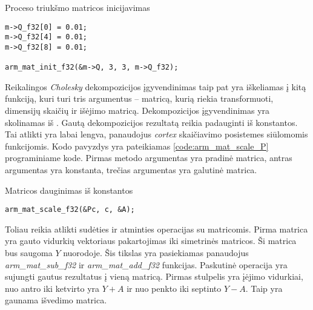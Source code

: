\begin{cfigure}
    \centering
    \caption{Proceso triukšmo matricos inicijavimas}
    \label{code:arm_q_matrix_init}
    \begin{lstlisting}
m->Q_f32[0] = 0.01;
m->Q_f32[4] = 0.01;
m->Q_f32[8] = 0.01;

arm_mat_init_f32(&m->Q, 3, 3, m->Q_f32);
    \end{lstlisting}
\end{cfigure}

Reikalingos \textit{Cholesky} dekompozicijos įgyvendinimas taip pat yra iškeliamas į kitą funkciją, kuri turi tris argumentus -- matricą, kurią riekia transformuoti, dimensijų skaičių ir išėjimo matricą.
Dekompozicijos įgyvendinimas yra skolinamas iš \cite{Cholesky6:online}.
Gautą dekompozicijos rezultatą reikia padauginti iš konstantos.
Tai atlikti yra labai lengva, panaudojus \textit{cortex} skaičiavimo posistemes siūlomomis funkcijomis.
Kodo pavyzdys yra pateikiamas \ref{code:arm_mat_scale_P} programiniame kode.
Pirmas metodo argumentas yra pradinė matrica, antras argumentas yra konstanta, trečias argumentas yra galutinė matrica.

\begin{cfigure}
    \centering
    \caption{Matricos dauginimas iš konstantos}
    \label{code:arm_mat_scale_P}
    \begin{lstlisting}
arm_mat_scale_f32(&Pc, c, &A);
    \end{lstlisting}
\end{cfigure}

Toliau reikia atlikti sudėties ir atminties operacijas su matricomis.
Pirma matrica yra gauto vidurkių vektoriaus pakartojimas iki simetrinės matricos.
Ši matrica bus saugoma $Y$ nuorodoje.
Šis tikslas yra pasiekiamas panaudojus \textit{arm\_mat\_sub\_f32} ir \textit{arm\_mat\_add\_f32} funkcijas.
Paskutinė operacija yra sujungti gautus rezultatus į vieną matricą.
Pirmas stulpelis yra įėjimo vidurkiai, nuo antro iki ketvirto yra $Y+A$ ir nuo penkto iki septinto $Y-A$.
Taip yra gaunama išvedimo matrica.

